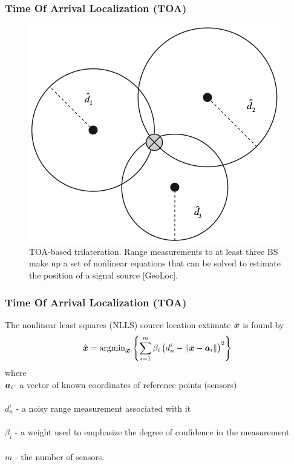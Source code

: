 \documentclass [t] {beamer} %
\begin{document}
\begin{frame} %
\frametitle{Time Of Arrival Localization (TOA)}
\begin{figure}[h]
\includegraphics[height=0.6\textheight]{../figures/toa_example.png}
\caption{TOA-based trilateration. Range measurements to at least three BS make
up a set of nonlinear equations that can be solved to estimate the position of a
signal source [GeoLoc].}
\label{fig:2step}
\end{figure}
\end{frame}

\begin{frame} %
\frametitle{Time Of Arrival Localization (TOA)}
\phantom{m}
The nonlinear least squares (NLLS) source location extimate $\hat{\mbox{\boldmath$x$}}$ is found by
\begin{equation}
\nonumber
\hat{\mbox{\boldmath$x$}} = \mbox{argmin}_{\mbox{\boldmath$x$}}\left\lbrace \sum_{i=1}^m \beta_i\left(d_n^i - \|\mbox{\boldmath$x$} -  \mbox{\boldmath$a$}_i \| \right)^2 \right\rbrace
\end{equation}
where 
\\
$\mbox{\boldmath$a$}_i$- a vector of known coordinates of reference points (sensors)
\\~\\
$d_n^i $ - a noisy range measurement associated with it
\\~\\
$\beta_i$ - a weight used to emphasize the degree of confidence in the
measurement
\\~\\
$m$ - the number of sensors.
\end{frame}
\end{document}
